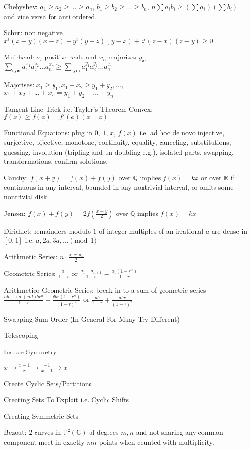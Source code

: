 Chebyshev: $a_1 \ge a_2 \ge \dots \ge a_n$, $b_1 \ge b_2 \ge \dots \ge b_n$, $n \sum a_i b_i \ge (\sum a_i)(\sum b_i)$ and vice versa for anti ordered.

Schur: non negative $x^t (x-y)(x-z)+y^t (y-z)(y-x)+z^t (z-x)(z-y) \ge 0$

Muirhead: $a_i$ positive reals and $x_n$ majorises $y_n$, $\sum_{\text{sym}} a_1^{x_1}a_2^{x_2}\dots a_n^{x_n} \ge \sum_{\text{sym}} a_1^{y_1}a_2^{y_2}\dots a_n^{y_n}$

Majorises: $x_1 \ge y_1, x_1+x_2 \ge y_1+y_2, \dots ,$ \\
$x_1+x_2+\dots+x_n=y_1+y_2+\dots+y_n$

Tangent Line Trick i.e. Taylor's Theorem Convex: $f(x) \ge f(a) + f'(a)(x-a)$

Functional Equations: plug in $0$, $1$, $x$, $f(x)$ i.e. ad hoc de novo injective, surjective, bijective, monotone, continuity, equality, canceling, substitutions, guessing, involution (tripling and un doubling e.g.), isolated parts, swapping, transformations, confirm solutions.

Cauchy: $f(x+y)=f(x)+f(y)$ over $\mathbb{Q}$ implies $f(x)=kx$ or over $\mathbb{R}$ if continuous in any interval, bounded in any nontrivial interval, or omits some nontrivial disk.

Jensen: $f(x)+f(y)=2f \left( \frac{x+y}{2} \right)$ over $\mathbb{Q}$ implies $f(x)=kx$

Dirichlet: remainders modulo $1$ of integer multiples of an irrational $a$ are dense in $[0,1]$ i.e. $a,2a,3a,\dots \pmod{1}$

Arithmetic Series: $n \cdot \frac{a_1 + a_n}{2}$

Geometric Series: $\frac{a_1}{1-r}$ or $\frac{a_1 - a_{n+1}}{1-r}=\frac{a_1 (1-r^n)}{1-r}$

Arithmetico-Geometric Series: break in to a sum of geometric series $\frac{ab-(a+nd)br^n}{1-r}+\frac{dbr(1-r^n)}{(1-r)^2}$ or $\frac{ab}{1-r}+\frac{dbr}{(1-r)^2}$

Swapping Sum Order (In General For Many Try Different)

Telescoping

Induce Symmetry

$x \to \frac{x-1}{x} \to \frac{-1}{x-1} \to x$

Create Cyclic Sets/Partitions

Creating Sets To Exploit i.e. Cyclic Shifts

Creating Symmetric Sets

Bezout: $2$ curves in $\mathbb{P}^2(\mathbb{C})$ of degrees $m,n$ and not sharing any common component meet in exactly $mn$ points when counted with multiplicity.

